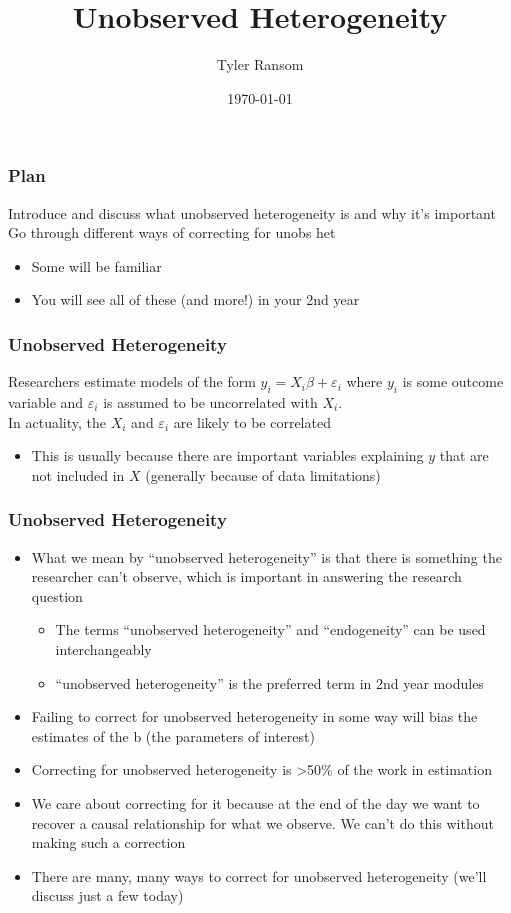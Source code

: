 \documentclass[english,xcolor=dvipsnames]{beamer}
\title[]{Unobserved Heterogeneity}
\author{Tyler Ransom}
\institute{Duke University}
\date{\today}
\newcommand{\bi}{\begin{itemize}}
\newcommand{\ei}{\end{itemize}}
\begin{document}
\begin{frame}
   \titlepage
\end{frame}

\begin{frame}
\frametitle{Plan}
Introduce and discuss what unobserved heterogeneity is and why it's important
Go through different ways of correcting for unobs het 
      \bi 
      \item Some will be familiar
      \item You will see all of these (and more!) in your 2nd year
      \ei
\end{frame}

\begin{frame}
\frametitle{Unobserved Heterogeneity}

Researchers estimate models of the form $y_{i} = X_{i}\beta + \varepsilon_{i}$ where $y_{i}$ is some outcome variable and $\varepsilon_{i}$ is assumed to be uncorrelated with $X_{i}$.\\
In actuality, the $X_{i}$ and $\varepsilon_{i}$ are likely to be correlated
      \bi 
      \item This is usually because there are important variables explaining $y$ that are not included in $X$ (generally because of data limitations)
      \ei
\end{frame}

\begin{frame}
\frametitle{Unobserved Heterogeneity}
   \bi 
   \item What we mean by ``unobserved heterogeneity'' is that there is something the researcher can't observe, which is important in answering the research question
      \bi 
      \item The terms ``unobserved heterogeneity'' and ``endogeneity'' can be used interchangeably
      \item ``unobserved heterogeneity'' is the preferred term in 2nd year modules
      \ei
   \item Failing to correct for unobserved heterogeneity in some way will bias the estimates of the b (the parameters of interest)
   \item Correcting for unobserved heterogeneity is >50\% of the work in estimation
   \item We care about correcting for it because at the end of the day we want to recover a causal relationship for what we observe. We can't do this without making such a correction
   \item There are many, many ways to correct for unobserved heterogeneity (we'll discuss just a few today)
   \ei
\end{frame}
\end{document}
